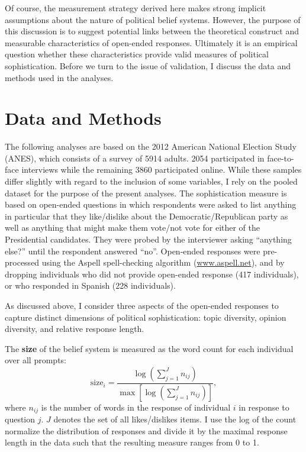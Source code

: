 \documentclass[12pt]{article}
\begin{document}
Of course, the measurement strategy derived here makes strong implicit assumptions about the nature of political belief systems. However, the purpose of this discussion is to suggest potential links between the theoretical construct and measurable characteristics of open-ended responses. Ultimately it is an empirical question whether these characteristics provide valid measures of political sophistication. Before we turn to the issue of validation, I discuss the data and methods used in the analyses.


\section*{Data and Methods}


The following analyses are based on the 2012 American National Election Study (ANES), which consists of a survey of 5914 adults. 2054 participated in face-to-face interviews while the remaining 3860 participated online. While these samples differ slightly with regard to the inclusion of some variables, I rely on the pooled dataset for the purpose of the present analyses. The sophistication measure is based on open-ended questions in which respondents were asked to list anything in particular that they like/dislike about the Democratic/Republican party as well as anything that might make them vote/not vote for either of the Presidential candidates. They were probed by the interviewer asking ``anything else?'' until the respondent answered ``no''. Open-ended responses were pre-processed using the Aspell spell-checking algorithm (\url{www.aspell.net}), and by dropping individuals who did not provide open-ended response (417 individuals), or who responded in Spanish (228 individuals). 

As discussed above, I consider three aspects of the open-ended responses to capture distinct dimensions of political sophistication: topic diversity, opinion diversity, and relative response length. 

The \textbf{size} of the belief system is measured as the word count for each individual over all prompts:
\begin{equation}
\text{size}_i = \dfrac{\log\left(\sum_{j=1}^J n_{ij}\right)}{\max\left[\log\left(\sum_{j=1}^J n_{ij}\right)\right]},
\end{equation}
where $n_{ij}$ is the number of words in the response of individual $i$ in response to question $j$. $J$ denotes the set of all likes/dislikes items. I use the log of the count normalize the distribution of responses and divide it by the maximal response length in the data such that the resulting measure ranges from 0 to 1.
\end{document}
